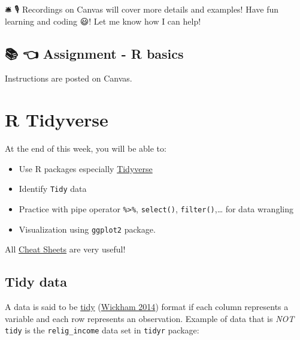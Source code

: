 \documentclass[
  letterpaper,
  DIV=11,
  numbers=noendperiod]{scrreprt}
\providecommand{\tightlist}{%
  \setlength{\itemsep}{0pt}\setlength{\parskip}{0pt}}\usepackage{longtable,booktabs,array}
\begin{document}
🛎 🎙️ Recordings on Canvas will cover more details and examples! Have fun
learning and coding 😃! Let me know how I can help!

\hypertarget{assignment---r-basics}{%
\section*{📚 👈 Assignment - R basics}\label{assignment---r-basics}}


Instructions are posted on Canvas.

\hypertarget{r-tidyverse}{%
\chapter*{R Tidyverse}\label{r-tidyverse}}


At the end of this week, you will be able to:

\begin{itemize}
\tightlist
\item
  Use R packages especially \href{https://www.tidyverse.org/}{Tidyverse}
\item
  Identify \texttt{Tidy} data
\item
  Practice with pipe operator \texttt{\%\textgreater{}\%},
  \texttt{select()}, \texttt{filter()},\ldots{} for data wrangling
\item
  Visualization using \texttt{ggplot2} package.
\end{itemize}

All \href{https://www.rstudio.com/resources/cheatsheets/}{Cheat Sheets}
are very useful!

\hypertarget{tidy-data}{%
\section*{Tidy data}\label{tidy-data}}


A data is said to be
\href{https://vita.had.co.nz/papers/tidy-data.html}{tidy}
(\protect\hyperlink{ref-tidy-data}{Wickham 2014}) format if each column
represents a variable and each row represents an observation. Example of
data that is \emph{NOT} \texttt{tidy} is the \texttt{relig\_income} data
set in \texttt{tidyr} package:
\end{document}
